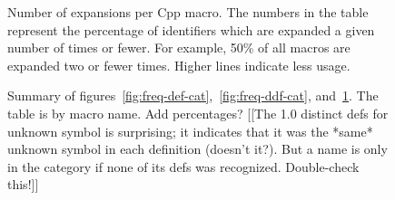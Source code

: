 \documentclass[10pt]{article}
\newcommand{\pkg}[1]{\textsf{#1}}
\begin{document}



\begin{figure}
\centerline{}
\caption{Number of expansions per Cpp macro.  The numbers in the
  table represent the percentage of identifiers which are expanded a given
  number of times or fewer.  For example, 50\% of all
  macros are expanded two or fewer times. Higher lines indicate less usage.}
\label{fig:freq-use-cat}
\end{figure}


\begin{figure}
  {\small\centerline{}}
  
  \caption{Summary of
    figures~\ref{fig:freq-def-cat},~\ref{fig:freq-ddf-cat},
    and~\ref{fig:freq-use-cat}.  The table is by macro name.  Add percentages?
    [[The 1.0 distinct defs for unknown symbol is surprising; it indicates
    that it was the *same* unknown symbol in each definition (doesn't
    it?).  But a name is only in the category if none of its defs was
    recognized.  Double-check this!]]}
  \label{fig:freq-sum-cat}
\end{figure}
\end{document}
